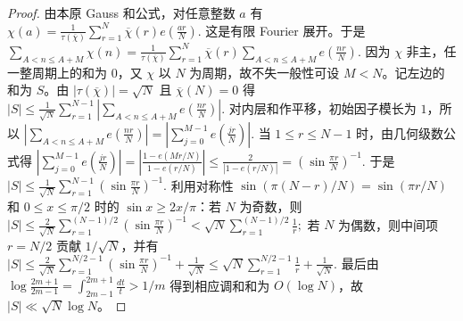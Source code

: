 \begin{proof}
由本原 Gauss 和公式，对任意整数 $a$ 有
\(
  \chi(a)
  =
  \frac1{\tau(\overline{\chi})}
  \sum_{r=1}^{N}\overline{\chi}(r)e\!\left(\frac{ar}{N}\right).
\)
这是有限 Fourier 展开。于是
\(
  \sum_{A<n\le A+M}\chi(n)
  =
  \frac1{\tau(\overline{\chi})}
  \sum_{r=1}^{N}\overline{\chi}(r)
  \sum_{A<n\le A+M}e\!\left(\frac{nr}{N}\right).
\)
因为 $\chi$ 非主，任一整周期上的和为 $0$，又 $\chi$ 以 $N$ 为周期，故不失一般性可设 $M<N$。记左边的和为 $S$。由 $|\tau(\overline{\chi})|=\sqrt N$ 且 $\overline{\chi}(N)=0$ 得
\(
  |S|
  \le
  \frac1{\sqrt N}
  \sum_{r=1}^{N-1}
  \left|
  \sum_{A<n\le A+M}e\!\left(\frac{nr}{N}\right)
  \right|.
\)
对内层和作平移，初始因子模长为 $1$，所以
\(
  \left|
  \sum_{A<n\le A+M}e\!\left(\frac{nr}{N}\right)
  \right|
  =
  \left|
  \sum_{j=0}^{M-1}e\!\left(\frac{jr}{N}\right)
  \right|.
\)
当 $1\le r\le N-1$ 时，由几何级数公式得
\(
  \left|
  \sum_{j=0}^{M-1}e\!\left(\frac{jr}{N}\right)
  \right|
  =
  \left|
  \frac{1-e(Mr/N)}{1-e(r/N)}
  \right|
  \le
  \frac2{|1-e(r/N)|}
  =
  \left(\sin\frac{\pi r}{N}\right)^{-1}.
\)
于是
\(
  |S|
  \le
  \frac1{\sqrt N}
  \sum_{r=1}^{N-1}
  \left(\sin\frac{\pi r}{N}\right)^{-1}.
\)
利用对称性 $\sin(\pi(N-r)/N)=\sin(\pi r/N)$ 和 $0\le x\le\pi/2$ 时的 $\sin x\ge 2x/\pi$：若 $N$ 为奇数，则
\(
  |S|
  \le
  \frac2{\sqrt N}
  \sum_{r=1}^{(N-1)/2}
  \left(\sin\frac{\pi r}{N}\right)^{-1}
  <
  \sqrt N
  \sum_{r=1}^{(N-1)/2}\frac1r;
\)
若 $N$ 为偶数，则中间项 $r=N/2$ 贡献 $1/\sqrt N$，并有
\(
  |S|
  \le
  \frac2{\sqrt N}
  \sum_{r=1}^{N/2-1}
  \left(\sin\frac{\pi r}{N}\right)^{-1}
  +
  \frac1{\sqrt N}
  \le
  \sqrt N
  \sum_{r=1}^{N/2-1}\frac1r
  +
  \frac1{\sqrt N}.
\)
最后由 $\log\frac{2m+1}{2m-1}=\int_{2m-1}^{2m+1}\frac{dt}{t}>1/m$ 得到相应调和和为 $O(\log N)$，故 $|S|\ll\sqrt N\log N$。
\end{proof}
